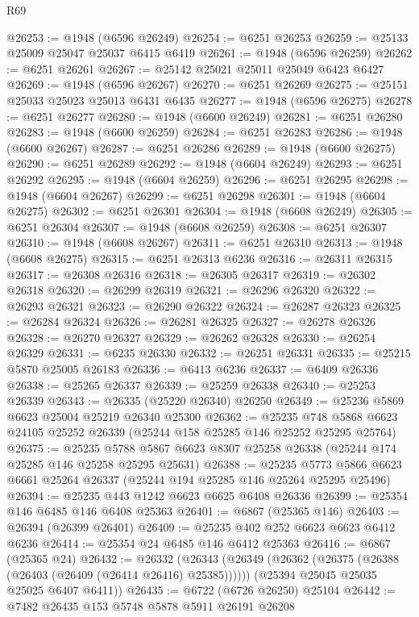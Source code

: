 \begin{lexlean}{R69}
\begin{coremodule}
{@26253 := @1948 (@6596 @26249)
@26254 := @6251 @26253
@26259 := @25133 @25009 @25047 @25037 @6415 @6419
@26261 := @1948 (@6596 @26259)
@26262 := @6251 @26261
@26267 := @25142 @25021 @25011 @25049 @6423 @6427
@26269 := @1948 (@6596 @26267)
@26270 := @6251 @26269
@26275 := @25151 @25033 @25023 @25013 @6431 @6435
@26277 := @1948 (@6596 @26275)
@26278 := @6251 @26277
@26280 := @1948 (@6600 @26249)
@26281 := @6251 @26280
@26283 := @1948 (@6600 @26259)
@26284 := @6251 @26283
@26286 := @1948 (@6600 @26267)
@26287 := @6251 @26286
@26289 := @1948 (@6600 @26275)
@26290 := @6251 @26289
@26292 := @1948 (@6604 @26249)
@26293 := @6251 @26292
@26295 := @1948 (@6604 @26259)
@26296 := @6251 @26295
@26298 := @1948 (@6604 @26267)
@26299 := @6251 @26298
@26301 := @1948 (@6604 @26275)
@26302 := @6251 @26301
@26304 := @1948 (@6608 @26249)
@26305 := @6251 @26304
@26307 := @1948 (@6608 @26259)
@26308 := @6251 @26307
@26310 := @1948 (@6608 @26267)
@26311 := @6251 @26310
@26313 := @1948 (@6608 @26275)
@26315 := @6251 @26313 @6236
@26316 := @26311 @26315
@26317 := @26308 @26316
@26318 := @26305 @26317
@26319 := @26302 @26318
@26320 := @26299 @26319
@26321 := @26296 @26320
@26322 := @26293 @26321
@26323 := @26290 @26322
@26324 := @26287 @26323
@26325 := @26284 @26324
@26326 := @26281 @26325
@26327 := @26278 @26326
@26328 := @26270 @26327
@26329 := @26262 @26328
@26330 := @26254 @26329
@26331 := @6235 @26330
@26332 := @26251 @26331
@26335 := @25215 @5870 @25005 @26183
@26336 := @6413 @6236
@26337 := @6409 @26336
@26338 := @25265 @26337
@26339 := @25259 @26338
@26340 := @25253 @26339
@26343 := @26335 (@25220 @26340) @26250
@26349 := @25236 @5869 @6623 @25004 @25219 @26340 @25300
@26362 := @25235
    @748
    @5868
    @6623
    @24105
    @25252
    @26339
    (@25244 @158 @25285 @146 @25252 @25295 @25764)
@26375 := @25235
    @5788
    @5867
    @6623
    @8307
    @25258
    @26338
    (@25244 @174 @25285 @146 @25258 @25295 @25631)
@26388 := @25235
    @5773
    @5866
    @6623
    @6661
    @25264
    @26337
    (@25244 @194 @25285 @146 @25264 @25295 @25496)
@26394 := @25235 @443 @1242 @6623 @6625 @6408 @26336
@26399 := @25354 @146 @6485 @146 @6408 @25363
@26401 := @6867 (@25365 @146)
@26403 := @26394 (@26399 @26401)
@26409 := @25235 @402 @252 @6623 @6623 @6412 @6236
@26414 := @25354 @24 @6485 @146 @6412 @25363
@26416 := @6867 (@25365 @24)
@26432 := @26332
    (@26343
      (@26349 (@26362 (@26375 (@26388 (@26403 (@26409 (@26414 @26416) @25385))))))
      (@25394 @25045 @25035 @25025 @6407 @6411))
@26435 := @6722 (@6726 @26250) @25104
@26442 := @7482 @26435 @153 @5748 @5878 @5911 @26191 @26208
}
\end{coremodule}
\end{lexlean}
